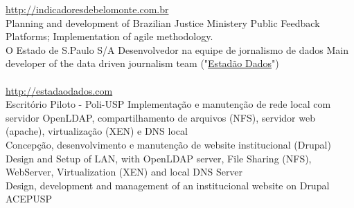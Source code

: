 \documentclass[]{friggeri-cv}
\begin{document}
\begin{entrylist}
{     \href{http://indicadoresdebelomonte.com.br}{http://indicadoresdebelomonte.com.br}\\}
  \entry
    {}
    {}
    {\href{http://participacao.mj.gov.br}{}}
    {%
               {Planning and development of Brazilian Justice Ministery Public Feedback Platforms; Implementation of agile methodology.}\\
    }
  \entry
    {}
    {}
    {O Estado de S.Paulo S/A}
    {%
        {Desenvolvedor na equipe de jornalismo de dados}%
        {Main developer of the data driven journalism team}
        ("\href{http://estadaodados.com}{Estadão Dados}")\\
     \\
     \href{http://estadaodados.com}{http://estadaodados.com}\\}
   \entry
    {}
    {}
    {Escritório Piloto - Poli-USP}
    {%
        {Implementação e manutenção de rede local com servidor OpenLDAP, \nohyphens{compartilhamento} de arquivos (NFS), servidor web (apache), virtualização (XEN) e DNS local\\
        Concepção, desenvolvimento e manutenção de website institucional (Drupal)\\}%
        {Design and Setup of LAN, with OpenLDAP server, File Sharing (NFS), WebServer, Virtualization (XEN) and local DNS Server\\
     Design, development and management of an institucional website on Drupal\\}
    }
   \entry
    {}
    {}
    {ACEPUSP}
    {\\}

\end{entrylist}
\end{document}
